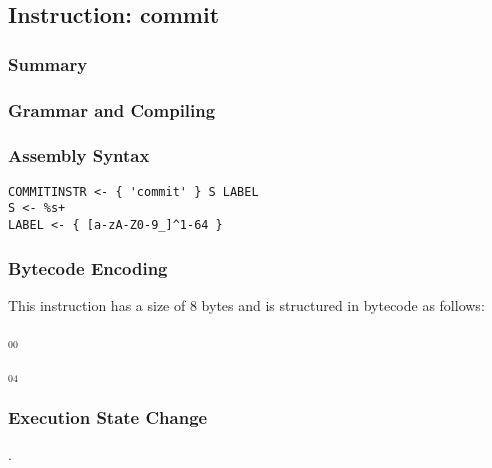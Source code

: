 \subsection{Instruction: commit}

\subsubsection{Summary}


\subsubsection{Grammar and Compiling}


\subsubsection{Assembly Syntax}

\begin{myquote}
\begin{verbatim}
COMMITINSTR <- { 'commit' } S LABEL
S <- %s+
LABEL <- { [a-zA-Z0-9_]^1-64 }
\end{verbatim}
\end{myquote}

\subsubsection{Bytecode Encoding}

This instruction has a size of 8 bytes and is structured in bytecode as follows:

$_{00}$\ 



$_{04}$\ 


\subsubsection{Execution State Change}

.


